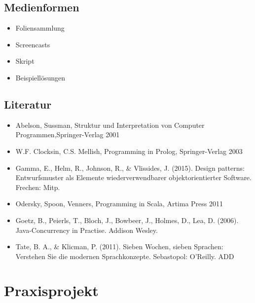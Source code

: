 \hypertarget{medienformenpathlabelmi-2017modulbeschreibungen-bachelorba_paradigmen-der-programmierung}{%
\section*{Medienformen\label{/mi-2017/modulbeschreibungen-bachelor/BA_Paradigmen-der-Programmierung}}\label{medienformenpathlabelmi-2017modulbeschreibungen-bachelorba_paradigmen-der-programmierung}}

\begin{itemize}
\tightlist
\item
  Foliensammlung
\item
  Screencasts
\item
  Skript
\item
  Beispiellösungen
\end{itemize}

\hypertarget{literaturpathlabelmi-2017modulbeschreibungen-bachelorba_paradigmen-der-programmierung}{%
\section*{Literatur\label{/mi-2017/modulbeschreibungen-bachelor/BA_Paradigmen-der-Programmierung}}\label{literaturpathlabelmi-2017modulbeschreibungen-bachelorba_paradigmen-der-programmierung}}

\begin{itemize}
\tightlist
\item
  Abelson, Sussman, Struktur und Interpretation von Computer
  Programmen,Springer-Verlag 2001
\item
  W.F. Clocksin, C.S. Mellish, Programming in Prolog, Springer-Verlag
  2003
\item
  Gamma, E., Helm, R., Johnson, R., \& Vlissides, J. (2015). Design
  patterns: Entwurfsmuster als Elemente wiederverwendbarer
  objektorientierter Software. Frechen: Mitp.
\item
  Odersky, Spoon, Venners, Programming in Scala, Artima Press 2011
\item
  Goetz, B., Peierls, T., Bloch, J., Bowbeer, J., Holmes, D., Lea, D.
  (2006). Java-Concurrency in Practise. Addison Wesley.
\item
  Tate, B. A., \& Klicman, P. (2011). Sieben Wochen, sieben Sprachen:
  Verstehen Sie die modernen Sprachkonzepte. Sebastopol: O'Reilly. ADD
\end{itemize}

\hypertarget{praxisprojektpathlabelmi-2017modulbeschreibungen-bachelorba_praxisprojekt}{%
\chapter{Praxisprojekt\label{/mi-2017/modulbeschreibungen-bachelor/BA_Praxisprojekt}}\label{praxisprojektpathlabelmi-2017modulbeschreibungen-bachelorba_praxisprojekt}}

